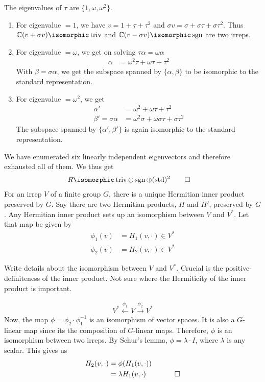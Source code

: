The eigenvalues of $\tau$ are $\{1,\omega,\omega^2\}$. 
\begin{enumerate}
    \makethislistcompact
    \item For eigenvalue $=1$, we have $v=1 + \tau + \tau^2$ and $\sigma v = \sigma + \sigma\tau + \sigma\tau^2$. Thus $\CC (v+\sigma v)\isomorphic \triv$ and $\CC (v-\sigma v) \isomorphic \sgn$ are two irreps.
    \item For eigenvalue $=\omega$, we get on solving $\tau \alpha = \omega \alpha$
        \begin{align}
            \alpha &= \omega^2\tau + \omega\tau + \tau^2
        \end{align}
        With $\beta = \sigma \alpha$, we get the subspace spanned by $\{\alpha,\beta\}$ to be isomorphic to the standard representation.
    \item For eigenvalue $=\omega^2$, we get 
        \begin{align}
            \alpha' &= \omega^2 + \omega\tau + \tau^2\\
            \beta' = \sigma\alpha &= \omega^2\sigma + \omega\sigma\tau + \sigma\tau^2
        \end{align}
        The subspace spanned by $\{\alpha',\beta'\}$ is again isomorphic to the standard representation.
\end{enumerate}
We have enumerated six linearly independent eigenvectors and therefore exhausted all of them. We thus get
\begin{align}
   R &\isomorphic \triv \oplus \sgn \oplus (\std)^2 \quad\quad\square    
\end{align}
 For an irrep $V$ of a finite group $G$, there is a unique Hermitian inner product preserved by $G$. Say there are two Hermitian products, $H$ and $H'$, preserved by $G$. Any Hermitian inner product sets up an isomorphism between $V$ and $V^*$. Let that map be given by
\begin{align}
    \phi_1(v) &= H_1(v,\cdot) \in V^*\\
    \phi_2(v) &= H_2(v,\cdot) \in V^*
\end{align}
\begin{insight}
    Write details about the isomorphism between $V$ and $V^*$. Crucial is the positive-definiteness of the inner product. Not sure where the Hermiticity of the inner product is important.
\end{insight}
\begin{align}
    V^* \xleftarrow{\phi_1} V \xrightarrow{\phi_2} V^*
\end{align}
Now, the map $\phi = \phi_2\cdot\phi_1^{-1}$ is an isomorphism of vector spaces. It is also a $G$-linear map since its the composition of $G$-linear maps. Therefore, $\phi$ is an isomorphism between two irreps. By Schur's lemma, $\phi=\lambda\cdot I$, where $\lambda$ is any scalar. This gives us
\begin{align}
    H_2(v,\cdot) &= \phi(H_1(v,\cdot)) \\
        &= \lambda H_1(v,\cdot)\quad\quad\qed
\end{align}

